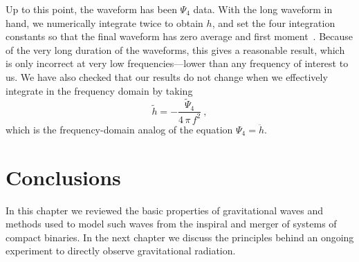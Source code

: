 Up to this point, the waveform has been $\Psi_{4}$ data.  With the
long waveform in hand, we numerically integrate twice to obtain $h$,
and set the four integration constants so that the final waveform has
zero average and first moment~\cite{Pfeiffer-Brown-etal:2007}.
Because of the very long duration of the waveforms, this gives a
reasonable result, which is only incorrect at very low
frequencies---lower than any frequency of interest to us.  We have
also checked that our results do not change when we effectively
integrate in the frequency domain by taking
\begin{equation}
  \label{eq:PsiFourIntegration}
  \tilde{h} = -\frac{\tilde{\Psi}_{4}}{4\,\pi\, f^{2}}\ ,
\end{equation}
which is the frequency-domain analog of the equation $\Psi_{4} =
\ddot{h}$.
\fi
\section{Conclusions}

In this chapter we reviewed the basic properties of gravitational
waves and methods used to model such waves from the inspiral and
merger of systems of compact binaries.  In the next chapter we discuss
the principles behind an ongoing experiment to directly observe
gravitational radiation.


